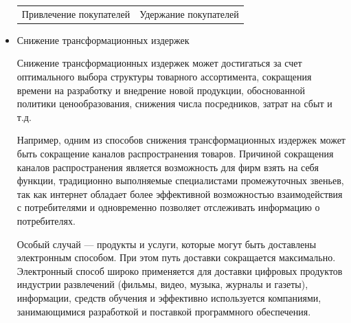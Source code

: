 \documentclass[a4paper,english,russian]{G2-105}
\begin{document}
\begin{itemize}
\begin{longtable}{|c|c|}
    Привлечение покупателей & Удержание покупателей \\
\end{longtable}
\item Снижение трансформационных издержек
\par Снижение трансформационных издержек может достигаться за счет оптимального выбора структуры товарного ассортимента, сокращения времени на разработку и внедрение новой продукции, обоснованной политики ценообразования, снижения числа посредников, затрат на сбыт и т.д.
\par Например, одним из способов снижения трансформационных издержек может быть сокращение каналов распространения товаров. Причиной сокращения каналов распространения является возможность для фирм взять на себя функции, традиционно выполняемые специалистами промежуточных звеньев, так как интернет обладает более эффективной возможностью взаимодействия с потребителями и одновременно позволяет отслеживать информацию о потребителях.
\par Особый случай --- продукты и услуги, которые могут быть доставлены электронным способом. При этом путь доставки сокращается максимально. Электронный способ широко применяется для доставки цифровых продуктов индустрии развлечений (фильмы, видео, музыка, журналы и газеты), информации, средств обучения и эффективно используется компаниями, занимающимися разработкой и поставкой программного обеспечения.
\end{itemize}
\end{document}

